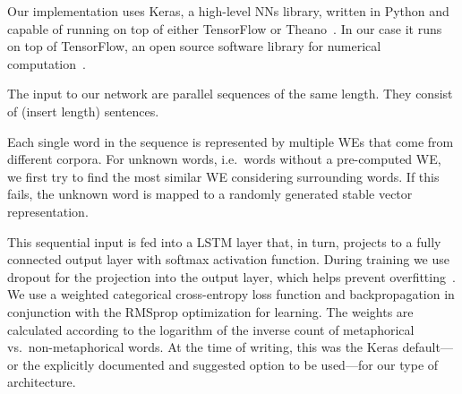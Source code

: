 \documentclass[11pt,a4paper]{article}
\begin{document}

Our implementation uses Keras, a high-level NNs library, written in Python and
capable of running on top of either TensorFlow or Theano~\cite{chollet2015}. 
In our case it runs on top of TensorFlow, an open source software library for numerical computation~\cite{tensorflow2016}.

The input to our network are parallel sequences of the same length. They consist of (insert length) sentences.

Each single word in the sequence is represented by multiple WEs that come from different corpora. %
For unknown words, i.e.~words without a pre-computed WE, we first try to
find the most similar WE considering %
surrounding words.  
If this fails, the unknown word is mapped to a randomly generated stable vector
representation.

This sequential input is fed into a LSTM layer that, in turn, projects to a
fully connected output layer with softmax activation function.
During training we use dropout for the projection into the output layer,
which helps prevent overfitting~\cite{Srivastava2014}.
We use a weighted categorical cross-entropy loss function and backpropagation in
conjunction with the RMSprop optimization for learning.  The weights are calculated according to the logarithm of the inverse count of metaphorical vs.~non-metaphorical words.
At the time of writing, this was the Keras default---or the explicitly
documented and suggested option to be used---for our type of architecture. 
\end{document}

